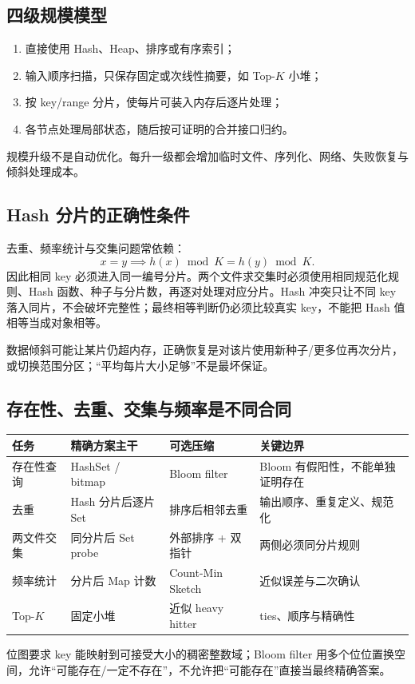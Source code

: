 \documentclass[UTF8,fontset=none,11pt,a4paper]{ctexart}
\begin{document}
\subsection{四级规模模型}
\begin{enumerate}
  \item {}直接使用 Hash、Heap、排序或有序索引；
  \item {}输入顺序扫描，只保存固定或次线性摘要，如 Top-$K$ 小堆；
  \item {}按 key/range 分片，使每片可装入内存后逐片处理；
  \item {}各节点处理局部状态，随后按可证明的合并接口归约。
\end{enumerate}
规模升级不是自动优化。每升一级都会增加临时文件、序列化、网络、失败恢复与倾斜处理成本。

\subsection{Hash 分片的正确性条件}
去重、频率统计与交集问题常依赖：
\[
x=y\implies h(x)\bmod K=h(y)\bmod K.
\]
因此相同 key 必须进入同一编号分片。两个文件求交集时必须使用相同规范化规则、Hash 函数、种子与分片数，再逐对处理对应分片。Hash 冲突只让不同 key 落入同片，不会破坏完整性；最终相等判断仍必须比较真实 key，不能把 Hash 值相等当成对象相等。

数据倾斜可能让某片仍超内存，正确恢复是对该片使用新种子/更多位再次分片，或切换范围分区；“平均每片大小足够”不是最坏保证。

\subsection{存在性、去重、交集与频率是不同合同}
\begin{center}\small
\begin{tabularx}{\linewidth}{L{2.5cm}L{3.1cm}YY}
\toprule
任务 & 精确方案主干 & 可选压缩 & 关键边界\\
\midrule
存在性查询 & HashSet / bitmap & Bloom filter & Bloom 有假阳性，不能单独证明存在\\
去重 & Hash 分片后逐片 Set & 排序后相邻去重 & 输出顺序、重复定义、规范化\\
两文件交集 & 同分片后 Set probe & 外部排序 + 双指针 & 两侧必须同分片规则\\
频率统计 & 分片后 Map 计数 & Count-Min Sketch & 近似误差与二次确认\\
Top-$K$ & 固定小堆 & 近似 heavy hitter & ties、顺序与精确性\\
\bottomrule
\end{tabularx}
\end{center}
位图要求 key 能映射到可接受大小的稠密整数域；Bloom filter 用多个位位置换空间，允许“可能存在/一定不存在”，不允许把“可能存在”直接当最终精确答案。
\end{document}
